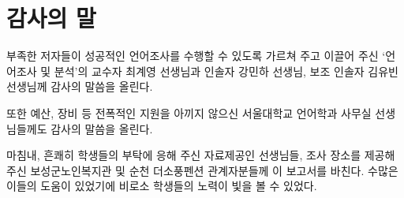 \chapter{감사의 말}

부족한 저자들이 성공적인 언어조사를 수행할 수 있도록 가르쳐 주고 이끌어 주신 `언어조사 및 분석'의 교수자 최계영 선생님과 인솔자 강민하 선생님, 보조 인솔자 김유빈 선생님께 감사의 말씀을 올린다.

또한 예산, 장비 등 전폭적인 지원을 아끼지 않으신 서울대학교 언어학과 사무실 선생님들께도 감사의 말씀을 올린다.

마침내, 흔쾌히 학생들의 부탁에 응해 주신 자료제공인 선생님들, 조사 장소를 제공해 주신 보성군노인복지관 및 순천 더소풍펜션 관계자분들께 이 보고서를 바친다. 수많은 이들의 도움이 있었기에 비로소 학생들의 노력이 빛을 볼 수 있었다.